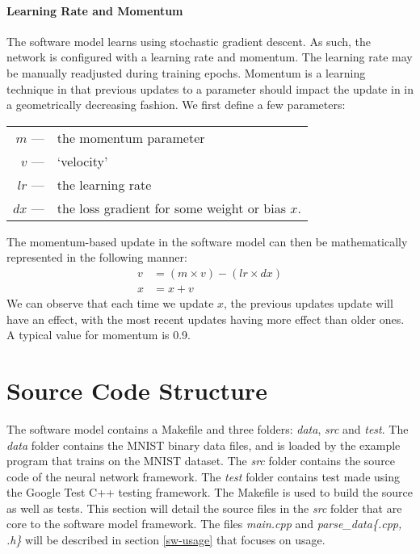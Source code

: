 \paragraph{Learning Rate and Momentum}
The software model learns using stochastic gradient descent. As such, the network is configured with a learning rate and momentum. The learning rate may be manually readjusted during training epochs. Momentum is a learning technique in that previous updates to a parameter should impact the update in in a geometrically decreasing fashion. We first define a few parameters:
\begin{center}
    \begin{tabular} {r l}
    $m$  \hspace{12pt}---& the momentum parameter\\ 
    $v$  \hspace{12pt}---& `velocity' \\
    $lr$ \hspace{12pt}---& the learning rate \\
    $dx$ \hspace{12pt}---& the loss gradient for some weight or bias $x$. 
    \end{tabular}
\end{center}

The momentum-based update in the software model can then be mathematically represented in the following manner:
\begin{align*}
v &=  (m \times v) - (lr \times dx) \\
x &= x + v 
\end{align*}
We can observe that each time we update $x$, the previous updates update will have an effect, with the most recent updates having more effect than older ones. A typical value for momentum is 0.9.


\section{Source Code Structure}
The software model contains a Makefile and three folders: \textit{data}, \textit{src} and \textit{test}. The \textit{data} folder contains the MNIST binary data files, and is loaded by the example program that trains on the MNIST dataset. The \textit{src} folder contains the source code of the neural network framework. The \textit{test} folder contains test made using the Google Test C++ testing framework. The Makefile is used to build the source as well as tests. This section will detail the source files in the \textit{src} folder that are core to the software model framework. The files \textit{main.cpp} and \textit{parse\_data\{.cpp, .h\}} will be described in section \ref{sw-usage} that focuses on usage.

